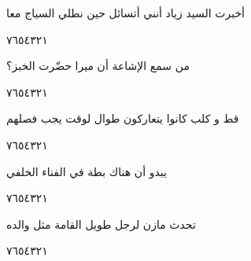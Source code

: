 \documentclass[11pt, a4paper]{article}
\begin{document}
	
	{\begin{flushright}
\textarabic{أخبرت السيد زياد أنني أتسائل حين نطلي السياج معا}
\end{flushright}

\begin{center}
        \hfill\textarabic{٧}\hfill\textarabic{٦}\hfill\textarabic{٥}\hfill\textarabic{٤}\hfill\textarabic{٣}\hfill\textarabic{٢}\hfill\textarabic{١}
        \end{center}


\vspace{0.5\baselineskip}\begin{flushright}
\textarabic{من سمع الإشاعة أن ميرا حضّرت الخبز؟}
\end{flushright}

\begin{center}
        \hfill\textarabic{٧}\hfill\textarabic{٦}\hfill\textarabic{٥}\hfill\textarabic{٤}\hfill\textarabic{٣}\hfill\textarabic{٢}\hfill\textarabic{١}
        \end{center}


\vspace{0.5\baselineskip}\begin{flushright}
\textarabic{قط و كلب كانوا يتعاركون طوال لوقت يجب فصلهم}
\end{flushright}

\begin{center}
        \hfill\textarabic{٧}\hfill\textarabic{٦}\hfill\textarabic{٥}\hfill\textarabic{٤}\hfill\textarabic{٣}\hfill\textarabic{٢}\hfill\textarabic{١}
        \end{center}


\vspace{0.5\baselineskip}\begin{flushright}
\textarabic{يبدو أن هناك بطة في الفناء الخلفي}
\end{flushright}

\begin{center}
        \hfill\textarabic{٧}\hfill\textarabic{٦}\hfill\textarabic{٥}\hfill\textarabic{٤}\hfill\textarabic{٣}\hfill\textarabic{٢}\hfill\textarabic{١}
        \end{center}


\vspace{0.5\baselineskip}\begin{flushright}
\textarabic{تحدث مازن لرجل طويل القامة مثل والده}
\end{flushright}

\begin{center}
        \hfill\textarabic{٧}\hfill\textarabic{٦}\hfill\textarabic{٥}\hfill\textarabic{٤}\hfill\textarabic{٣}\hfill\textarabic{٢}\hfill\textarabic{١}
        \end{center}


}
\end{document}
